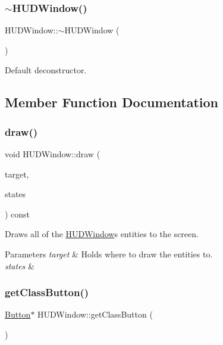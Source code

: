 \subsubsection{\texorpdfstring{$\sim$\+H\+U\+D\+Window()}{~HUDWindow()}}
{\footnotesize\ttfamily H\+U\+D\+Window\+::$\sim$\+H\+U\+D\+Window (\begin{DoxyParamCaption}{ }\end{DoxyParamCaption})}



Default deconstructor. 



\subsection{Member Function Documentation}
\mbox{\label{class_h_u_d_window_aaffd8bce3d1cd1fde416a69fabd9f81a}} 
\subsubsection{\texorpdfstring{draw()}{draw()}}
{\footnotesize\ttfamily void H\+U\+D\+Window\+::draw (\begin{DoxyParamCaption}\item[{sf\+::\+Render\+Target \&}]{target,  }\item[{sf\+::\+Render\+States}]{states }\end{DoxyParamCaption}) const\hspace{0.3cm}{\ttfamily [private]}}



Draws all of the \hyperlink{class_h_u_d_window}{H\+U\+D\+Window}\textquotesingle{}s entities to the screen. 


\begin{DoxyParams}{Parameters}
{\em target} & Holds where to draw the entities to. \\
\hline
{\em states} & \\
\hline
\end{DoxyParams}
\mbox{\label{class_h_u_d_window_aa4c9702e2f265e34560b9f2b77e468c4}} 
\subsubsection{\texorpdfstring{get\+Class\+Button()}{getClassButton()}}
{\footnotesize\ttfamily \hyperlink{class_button}{Button}$\ast$ H\+U\+D\+Window\+::get\+Class\+Button (\begin{DoxyParamCaption}{ }\end{DoxyParamCaption})}



